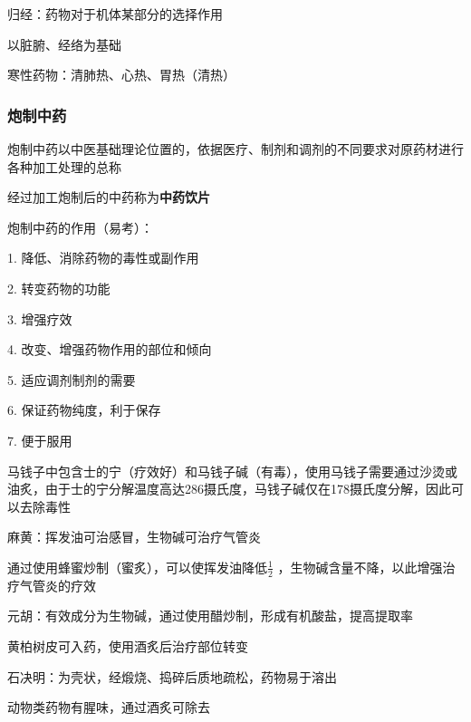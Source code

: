 \begin{defi}
    归经：药物对于机体某部分的选择作用

    以脏腑、经络为基础
\end{defi}
\begin{notation}
    寒性药物：清肺热、心热、胃热（清热）
\end{notation}

\subsubsection*{炮制中药}%
\label{subsub:炮制中药}
炮制中药以中医基础理论位置的，依据医疗、制剂和调剂的不同要求对原药材进行各种加工处理的总称

经过加工炮制后的中药称为\textbf{中药饮片}

\begin{notation}
    炮制中药的作用（易考）：

    1. 降低、消除药物的毒性或副作用

    2. 转变药物的功能

    3. 增强疗效

    4. 改变、增强药物作用的部位和倾向

    5. 适应调剂制剂的需要

    6. 保证药物纯度，利于保存

    7. 便于服用
\end{notation}
\begin{eg}
    马钱子中包含士的宁（疗效好）和马钱子碱（有毒），使用马钱子需要通过沙烫或油炙，由于士的宁分解温度高达286摄氏度，马钱子碱仅在178摄氏度分解，因此可以去除毒性
\end{eg}
\begin{eg}
    麻黄：挥发油可治感冒，生物碱可治疗气管炎

    通过使用蜂蜜炒制（蜜炙），可以使挥发油降低$\frac{1}{2}$ ，生物碱含量不降，以此增强治疗气管炎的疗效
\end{eg}
\begin{eg}
    元胡：有效成分为生物碱，通过使用醋炒制，形成有机酸盐，提高提取率
\end{eg}
\begin{eg}
    黄柏树皮可入药，使用酒炙后治疗部位转变
\end{eg}
\begin{eg}
    石决明：为壳状，经煅烧、捣碎后质地疏松，药物易于溶出
\end{eg}
\begin{eg}
    动物类药物有腥味，通过酒炙可除去
\end{eg}
